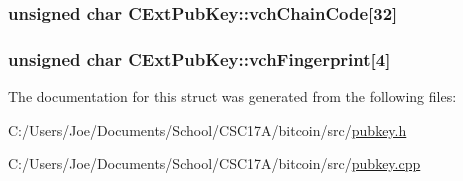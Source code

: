 \subsubsection[{vch\+Chain\+Code}]{\setlength{\rightskip}{0pt plus 5cm}unsigned char C\+Ext\+Pub\+Key\+::vch\+Chain\+Code\mbox{[}32\mbox{]}}\label{struct_c_ext_pub_key_a208836888dcc295ca1510de459ca1fc7}
\hypertarget{struct_c_ext_pub_key_a57101a84d16d7897bcec224e488143d9}{}
\subsubsection[{vch\+Fingerprint}]{\setlength{\rightskip}{0pt plus 5cm}unsigned char C\+Ext\+Pub\+Key\+::vch\+Fingerprint\mbox{[}4\mbox{]}}\label{struct_c_ext_pub_key_a57101a84d16d7897bcec224e488143d9}


The documentation for this struct was generated from the following files\+:\begin{DoxyCompactItemize}
\item 
C\+:/\+Users/\+Joe/\+Documents/\+School/\+C\+S\+C17\+A/bitcoin/src/\hyperlink{pubkey_8h}{pubkey.\+h}\item 
C\+:/\+Users/\+Joe/\+Documents/\+School/\+C\+S\+C17\+A/bitcoin/src/\hyperlink{pubkey_8cpp}{pubkey.\+cpp}\end{DoxyCompactItemize}
